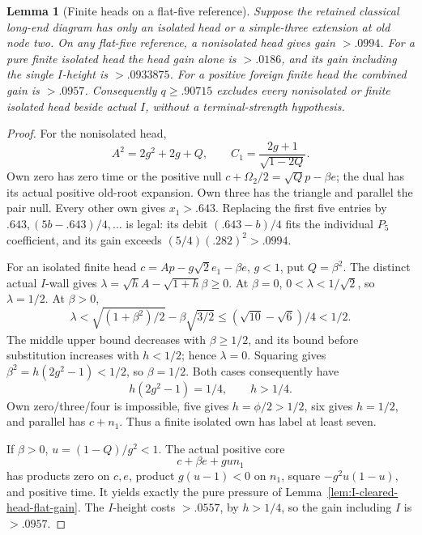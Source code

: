 \documentclass[11pt]{article}
\newtheorem{lemma}[theorem]{Lemma}
\theoremstyle{definition}
\theoremstyle{remark}
\begin{document}
\begin{lemma}[Finite heads on a flat-five reference]
\label{lem:I-finite-head-flat-reference}
Suppose the retained classical long-end diagram has only an isolated
head or a simple-three extension at old node two. On any flat-five
reference, a nonisolated head gives gain \(>.0994\).
For a pure finite isolated head the head gain alone is \(>.0186\),
and its gain including the single \(I\)-height is \(>.0933875\).
For a positive foreign finite head the combined gain is \(>.0957\).
Consequently \(q\ge.90715\) excludes every nonisolated or finite
isolated head beside actual \(I\), without a terminal-strength hypothesis.
\end{lemma}
\begin{proof}
For the nonisolated head,
\[
 A^2=2g^2+2g+Q,\qquad C_1={\frac{2g+1}{\sqrt{1-2Q}}}.
\]
Own zero has zero time or the positive null
\(c+\Omega_2/2=\sqrt Qp-\beta e\);
the dual has its actual positive old-root expansion.
Own three has the triangle and parallel the pair null.
Every other own gives \(x_1>.643\). Replacing the first five entries
by \(.643,(5b-.643)/4,\ldots\) is legal: its debit
\((.643-b)/4\) fits the individual \(P_5\) coefficient, and its
gain exceeds \((5/4)(.282)^2>.0994\).

For an isolated finite head
\(c=Ap-g\sqrt2e_1-\beta e\), \(g<1\), put \(Q=\beta^2\).
The distinct actual \(I\)-wall gives
\(\lambda=\sqrt h A-\sqrt{1+h}\beta\ge0\).
At \(\beta=0\), \(0<\lambda<1/\sqrt2\), so \(\lambda=1/2\).
At \(\beta>0\),
\[
 \lambda<\sqrt{(1+\beta^2)/2}-\beta\sqrt{3/2}
 \le(\sqrt{10}-\sqrt6)/4<1/2.
\]
The middle upper bound decreases with \(\beta\ge1/2\), and its
bound before substitution increases with \(h<1/2\); hence \(\lambda=0\).
Squaring gives \(\beta^2=h(2g^2-1)<1/2\), so \(\beta=1/2\).
Both cases consequently have
\[
 h(2g^2-1)=1/4,\qquad h>1/4.
\]
Own zero/three/four is impossible, five gives \(h=\phi/2>1/2\),
six gives \(h=1/2\), and parallel has \(c+n_1\).
Thus a finite isolated own has label at least seven.

If \(\beta>0\), \(u=(1-Q)/g^2<1\). The actual positive core
\[
 c+\beta e+gu n_1
\]
has products zero on \(c,e\), product \(g(u-1)<0\) on \(n_1\),
square \(-g^2u(1-u)\), and positive time. It yields exactly the
pure pressure of Lemma~\ref{lem:I-cleared-head-flat-gain}.
The \(I\)-height costs \(>.0557\), by \(h>1/4\), so the gain
including \(I\) is \(>.0957\).


\end{proof}
\end{document}
